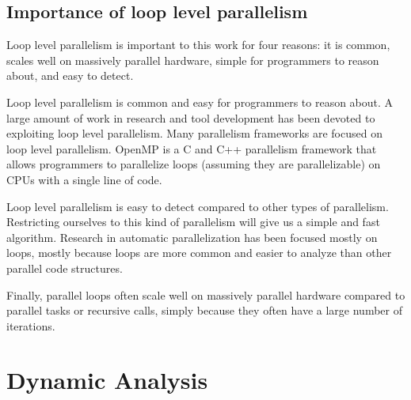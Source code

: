 \documentclass[12pt,twoside]{reedthesis}
\begin{document}
		\subsection{Importance of loop level parallelism}
		
		Loop level parallelism is important to this work for four reasons: it is common, scales well on massively parallel hardware, simple for programmers to reason about, and easy to detect. 
		
		Loop level parallelism is common and easy for programmers to reason about. 
		A large amount of work in research and tool development has been devoted to exploiting loop level parallelism. Many parallelism frameworks are focused on loop level parallelism. OpenMP is a C and C++ parallelism framework that allows programmers to parallelize loops (assuming they are parallelizable) on CPUs with a single line of code. 
		
		Loop level parallelism is easy to detect compared to other types of parallelism. Restricting ourselves to this kind of parallelism will give us a simple and fast algorithm.
		Research in automatic parallelization has been focused mostly on loops, mostly because loops are more common and easier to analyze than other parallel code structures. 
		
		Finally, parallel loops often scale well on massively parallel hardware compared to parallel tasks or recursive calls, simply because they often have a large number of iterations.
%		
%		
%		
%		
%		
%		
		\section{Dynamic Analysis}
		
\end{document}
